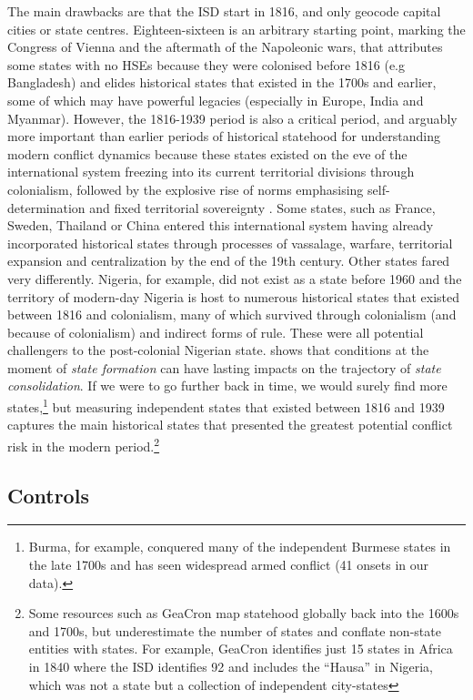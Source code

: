 The main drawbacks are that the ISD start in 1816, and only geocode capital
cities or state centres. Eighteen-sixteen is an arbitrary starting point,
marking the Congress of Vienna and the aftermath of the Napoleonic wars, that attributes some states with no HSEs because they were colonised before 1816
(e.g Bangladesh) and elides historical states that existed in the 1700s and
earlier, some of which may have powerful legacies (especially in Europe, India
and Myanmar). However, the 1816-1939 period is also a critical period, and
arguably more important than earlier periods of historical statehood for
understanding modern conflict dynamics because these states existed on the eve
of the international system freezing into its current territorial divisions through
colonialism, followed by the explosive rise of norms emphasising
self-determination and fixed territorial sovereignty \citep{Branch2013, Ahram2019,
Paine2019}. Some states, such as France, Sweden, Thailand or China entered this
international system having already incorporated historical states through
processes of vassalage, warfare, territorial expansion and centralization by the
end of the 19th century. Other states fared very differently. Nigeria, for
example, did not exist as a state before 1960 and the territory of modern-day
Nigeria is host to numerous historical states that existed between 1816 and
colonialism, many of which survived through colonialism (and because of
colonialism) and indirect forms of rule. These were all potential challengers to
the post-colonial Nigerian state. \citet{Mazzuca2021} shows that conditions at the moment of \textit{state formation} can have lasting impacts on the trajectory of \textit{state consolidation}. If we were to go further back in time, we
would surely find more states,\footnote{Burma, for example, conquered many of
the independent Burmese states in the late 1700s and has seen widespread armed
conflict (41 onsets in our data).} but measuring independent
states that existed between 1816 and 1939 captures the main historical states
that presented the greatest potential conflict risk in the modern period.\footnote{Some resources such as GeaCron map statehood globally back into the 1600s and 1700s, but underestimate the number of states and
conflate non-state entities with states. For example, GeaCron
identifies just 15 states in Africa in 1840 where the ISD identifies 92 and
includes the ``Hausa'' in Nigeria, which was not a state but a collection of independent city-states} 

\subsection{Controls}

